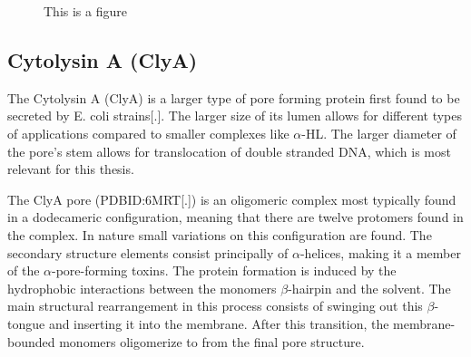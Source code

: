 \begin{figure}[ht]
\begin{centering}
  \caption{This is a figure}
  \label{fig:alphaHL}
  \end{centering}
\end{figure}

\subsection{Cytolysin A (ClyA)}

The Cytolysin A (ClyA) is a larger type of pore forming protein first found to be
secreted by E. coli strains[.]. The larger size of its lumen allows for different types
of applications compared to smaller complexes like $\alpha$-HL. The larger diameter of
the pore's stem allows for translocation of double stranded DNA, which is most relevant
for this thesis.

The ClyA pore (PDBID:6MRT[.]) is an oligomeric complex most typically found in a
 dodecameric configuration, meaning that there are twelve protomers found in the
complex. In nature small variations on this configuration are found. The secondary
structure elements consist principally of $\alpha$-helices, making it a member of the $
\alpha$-pore-forming toxins. The protein formation is induced by the hydrophobic
interactions between the monomers $\beta$-hairpin and the solvent. The main
structural rearrangement in this process consists of swinging out this $\beta$-tongue and
inserting it into the membrane. After this transition, the membrane-bounded monomers
oligomerize to from the final pore structure.


